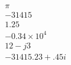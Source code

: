   \begin{align}
    \pi\\
    -31415\\
    1.25\\
    -0.34 \times 10^{4}\\
    12 - j 3\\
    -31415.23 + .45i
  \end{align}
